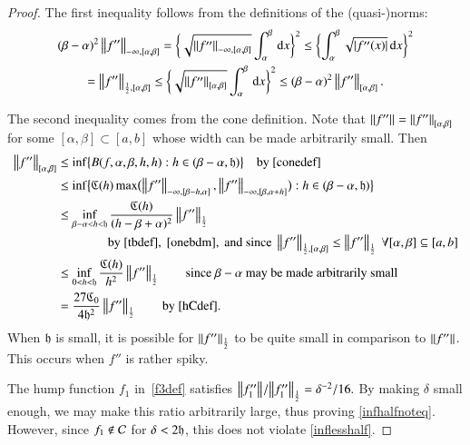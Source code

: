 \documentclass[review]{elsarticle}
\theoremstyle{definition}
\begin{document}
\begin{proof}
The first inequality follows from the definitions of the (quasi-)norms:
\begin{multline} \label{onebdm}
 (\beta - \alpha)^2 \norm[-\infty,{[\alpha,\beta]}]{f''}
 = \biggl\{\sqrt{\norm[-\infty,{[\alpha,\beta]}]{f''}}  \int_{\alpha}^{\beta} \, \dif x \biggr\}^2
 \le \biggl\{ \int_{\alpha}^{\beta} \sqrt{\abs{f''(x)}} \, \dif x \biggr\}^2\\
 = \norm[\frac 12,{[\alpha,\beta]}]{f''}
 \le\biggl\{\sqrt{\norm[{[\alpha,\beta]}]{f''}}  \int_{\alpha}^{\beta} \, \dif x \biggr\}^2
 \le  (\beta - \alpha)^2 \norm[{[\alpha,\beta]}]{f''}.
\end{multline}

The second inequality comes from the cone definition.  Note that
$\norm{f''}  = \norm[{[\alpha,\beta]}]{f''}$  for some $[\alpha,\beta] \subset [a,b]$ whose
width can be made arbitrarily small.  Then
\begin{align*}
\norm[{[\alpha,\beta]}]{f''}
& \le \inf\bigl\{B(f,\alpha,\beta,h,h) : h \in (\beta - \alpha,\fh) \bigr \} \quad \text{by}~\eqref{conedef} \\
& \le  \inf\bigl\{\fC(h) \max\bigl(\norm[-\infty,{[\beta - h, \alpha]}]{f''},
\norm[-\infty,{[\beta, \alpha+h]}]{f''}\bigr) : h \in (\beta - \alpha,\fh) \bigr \} \\
& \le \inf_{\beta - \alpha < h < \fh} \frac{\fC(h)}{(h-\beta+\alpha)^2}\norm[\frac 12]{f''} \\
& \qquad \qquad\text{by}~\eqref{tbdef},~\eqref{onebdm}, \text{ and since }
\norm[{\frac12,[\alpha,\beta]}]{f''} \le \norm[\frac 12]{f''} \ \forall [\alpha,\beta]
\subseteq [a,b] \\
& \le \inf_{0 < h < \fh} \frac{\fC(h)}{h^2}\norm[\frac 12]{f''} \qquad
\text{since $\beta-\alpha$ may be made arbitrarily small}\\
& = \frac{27\fC_0}{4\fh^2}\norm[\frac 12]{f''} \qquad \text{by \eqref{hCdef}}.
\end{align*}
When $\fh$ is small, it is possible for $\norm[\frac 12]{f''} $ to be quite
small in comparison to $\norm{f''}$. This occurs when $f''$ is rather spiky.

The hump function $f_1$ in~\eqref{f3def}  satisfies
$
 {\norm{f_1''}}/{\norm[\frac 12]{f_1''}}  =  { \delta^{-2}}/{16}.
$
By making $\delta$ small enough, we may make this ratio arbitrarily large, thus proving
\eqref{infhalfnoteq}. However, since $f_1
\notin \cc$ for $\delta < 2\fh$, this does not violate \eqref{inflesshalf}.
\end{proof}
\end{document}
